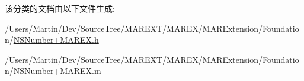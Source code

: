 该分类的文档由以下文件生成\+:\begin{DoxyCompactItemize}
\item 
/\+Users/\+Martin/\+Dev/\+Source\+Tree/\+M\+A\+R\+E\+X\+T/\+M\+A\+R\+E\+X/\+M\+A\+R\+Extension/\+Foundation/\hyperlink{_n_s_number_09_m_a_r_e_x_8h}{N\+S\+Number+\+M\+A\+R\+E\+X.\+h}\item 
/\+Users/\+Martin/\+Dev/\+Source\+Tree/\+M\+A\+R\+E\+X\+T/\+M\+A\+R\+E\+X/\+M\+A\+R\+Extension/\+Foundation/\hyperlink{_n_s_number_09_m_a_r_e_x_8m}{N\+S\+Number+\+M\+A\+R\+E\+X.\+m}\end{DoxyCompactItemize}
